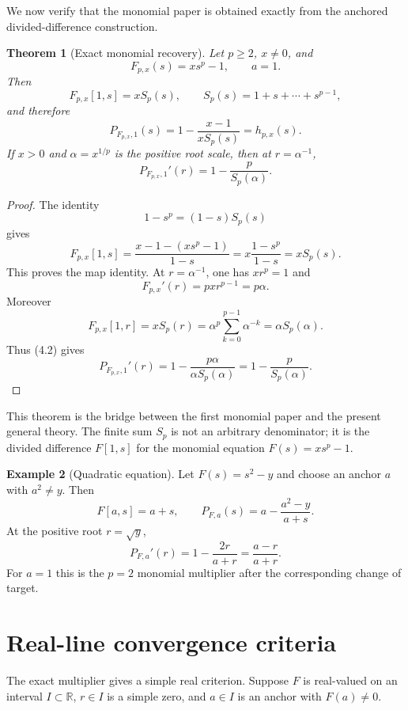 \documentclass[11pt]{article}
\newtheorem{theorem}{Theorem}[section]
\theoremstyle{definition}
\newtheorem{example}[theorem]{Example}
\newcommand{\R}{\mathbb{R}}
\begin{document}
We now verify that the monomial paper is obtained exactly from the anchored divided-difference construction.

\begin{theorem}[Exact monomial recovery]
Let $p\ge2$, $x\ne0$, and
\[
        F_{p,x}(s)=xs^p-1,
        \qquad a=1.
\]
Then
\[
        F_{p,x}[1,s]=xS_p(s),
        \qquad
        S_p(s)=1+s+\cdots+s^{p-1},
\]
and therefore
\[
        P_{F_{p,x},1}(s)
        =1-\frac{x-1}{xS_p(s)}
        =h_{p,x}(s).
\]
If $x>0$ and $\alpha=x^{1/p}$ is the positive root scale, then at $r=\alpha^{-1}$,
\[
        P_{F_{p,x},1}'(r)=1-\frac{p}{S_p(\alpha)}.
        \tag{5.1}
\]
\end{theorem}

\begin{proof}
The identity
\[
        1-s^p=(1-s)S_p(s)
\]
gives
\[
        F_{p,x}[1,s]
        =\frac{x-1-(xs^p-1)}{1-s}
        =x\frac{1-s^p}{1-s}=xS_p(s).
\]
This proves the map identity.  At $r=\alpha^{-1}$, one has $xr^p=1$ and
\[
        F_{p,x}'(r)=pxr^{p-1}=p\alpha.
\]
Moreover
\[
        F_{p,x}[1,r]=xS_p(r)
        =\alpha^p\sum_{k=0}^{p-1}\alpha^{-k}
        =\alpha S_p(\alpha).
\]
Thus (4.2) gives
\[
        P_{F_{p,x},1}'(r)=1-\frac{p\alpha}{\alpha S_p(\alpha)}=1-\frac{p}{S_p(\alpha)}.
\]
\end{proof}

This theorem is the bridge between the first monomial paper and the present general theory.  The finite sum $S_p$ is not an arbitrary denominator; it is the divided difference $F[1,s]$ for the monomial equation $F(s)=xs^p-1$.

\begin{example}[Quadratic equation]
Let $F(s)=s^2-y$ and choose an anchor $a$ with $a^2\ne y$.  Then
\[
        F[a,s]=a+s,
        \qquad
        P_{F,a}(s)=a-\frac{a^2-y}{a+s}.
\]
At the positive root $r=\sqrt{y}$,
\[
        P_{F,a}'(r)=1-\frac{2r}{a+r}=\frac{a-r}{a+r}.
\]
For $a=1$ this is the $p=2$ monomial multiplier after the corresponding change of target.
\end{example}

\section{Real-line convergence criteria}

The exact multiplier gives a simple real criterion.  Suppose $F$ is real-valued on an interval $I\subset\R$, $r\in I$ is a simple zero, and $a\in I$ is an anchor with $F(a)\ne0$.
\end{document}
